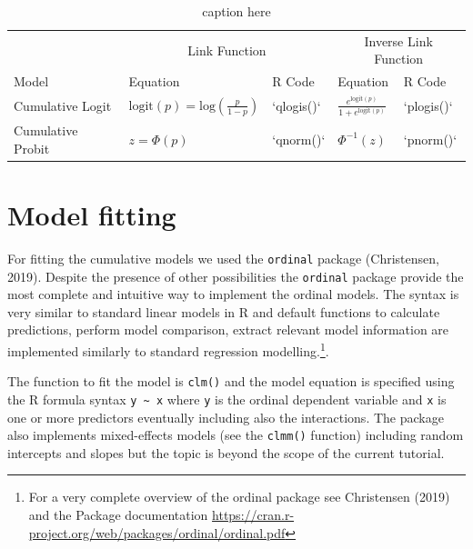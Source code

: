 \documentclass[
  man,floatsintext]{apa6}
\begin{document}
\normalsize

\scriptsize

\normalsize

\scriptsize

\begin{table}

\caption{\label{tab:tab-model-summary}caption here}
\centering
\begin{tabular}[t]{lllll}
\toprule
\multicolumn{1}{c}{} & \multicolumn{2}{c}{Link Function} & \multicolumn{2}{c}{Inverse Link Function} \\
\cmidrule(l{3pt}r{3pt}){2-3} \cmidrule(l{3pt}r{3pt}){4-5}
Model & Equation & R Code & Equation & R Code\\
\midrule
Cumulative Logit & $\text{logit}(p) = \text{log}(\frac{p}{1-p})$ & `qlogis()` & $\frac{e^{\text{logit}(p)}}{1 + e^{\text{logit}(p)}}$ & `plogis()`\\
Cumulative Probit & $z = \Phi(p)$ & `qnorm()` & $\Phi^{-1}(z)$ & `pnorm()`\\
\bottomrule
\end{tabular}
\end{table}

\normalsize

\section{Model fitting}\label{model-fitting}

For fitting the cumulative models we used the \texttt{ordinal} package (Christensen, 2019). Despite the presence of other possibilities the \texttt{ordinal} package provide the most complete and intuitive way to implement the ordinal models. The syntax is very similar to standard linear models in R and default functions to calculate predictions, perform model comparison, extract relevant model information are implemented similarly to standard regression modelling.\footnote{For a very complete overview of the ordinal package see Christensen (2019) and the Package documentation \url{https://cran.r-project.org/web/packages/ordinal/ordinal.pdf}}.

The function to fit the model is \texttt{clm()} and the model equation is specified using the R formula syntax \texttt{y\ \textasciitilde{}\ x} where \texttt{y} is the ordinal dependent variable and \texttt{x} is one or more predictors eventually including also the interactions. The package also implements mixed-effects models (see the \texttt{clmm()} function) including random intercepts and slopes but the topic is beyond the scope of the current tutorial.
\end{document}
